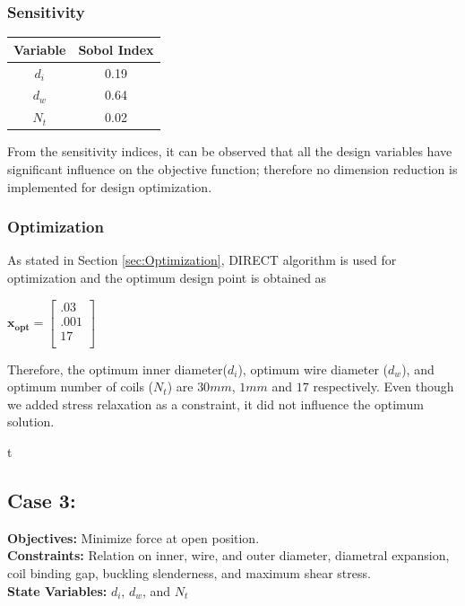 \documentclass[10pt]{article}
\begin{document}
\subsubsection{Sensitivity}		
 
		 \begin{center}
	 \begin{tabular}{| c  | c |  }
	 	\hline Variable & Sobol Index\\
	 	\hline $d_{i}$ & 0.19 \\
		\hline $d_{w}$ & 0.64  \\
		\hline $N_{t}$ & 0.02 \\ 
		\hline
	 \end{tabular}
\end{center}

From the sensitivity indices, it can be observed that all the design variables have significant influence on the objective function; therefore no dimension reduction is implemented for design optimization. 


\subsubsection{Optimization}
	
	As stated in Section \ref{sec:Optimization}, DIRECT algorithm is used for optimization and the optimum design point is obtained as 
	\begin{center}
	$\mathbf{x_{opt}} =
	\left[
	\begin{array}{c}
	 	 .03 \\
	 	 .001 \\
		 17    \\ 
		
	 \end{array}
	 \right]
$	
\end{center}
    Therefore, the optimum inner diameter($d_{i}$), optimum wire diameter ($d_{w}$), and optimum number of coils ($N_{t}$) are $30 mm$, $1 mm$ and $17$ respectively. Even though we added stress relaxation as a constraint, it did not influence the optimum solution.
    
    

\newpage
t
\subsection{Case 3:}
\label{subsec:Case3}
	\textbf{Objectives:} Minimize force at open position.\\
	\textbf{Constraints:} Relation on inner, wire, and outer diameter, diametral expansion, coil binding gap, buckling slenderness, and maximum shear stress. \\
	\textbf{State Variables:} $d_{i}$, $d_{w}$, and $N_{t}$ \\
\end{document}
